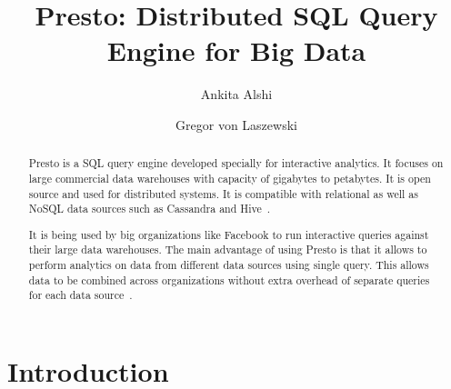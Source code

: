 
\title{Presto: Distributed SQL Query Engine for Big Data}


\author{Ankita Alshi}

\author{Gregor von Laszewski}




\begin{abstract}
Presto is a SQL query engine developed specially for interactive analytics. It
focuses on large commercial data warehouses with capacity of gigabytes to
petabytes. It is open source and used for distributed systems. It is compatible
with relational as well as NoSQL data sources such as Cassandra and
Hive~\cite{hid-sp18-502-prestodb-intro}.

It is being used by big organizations like Facebook to run interactive queries
against their large data warehouses. The main advantage of using Presto is that
it allows to perform analytics on data from different data sources using single
query. This allows data to be combined across organizations without extra
overhead of separate queries for each data
source~\cite{hid-sp18-502-prestodb-intro}.
\end{abstract}



\maketitle


\section{Introduction}

